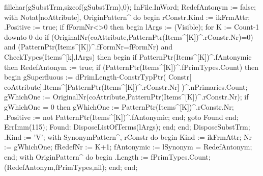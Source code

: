    fillchar(gSubstTrm,sizeof(gSubstTrm),0);
   InFile.InWord;
   RedefAntonym := false;
   with Notat[noAttribute], OriginPattern^ do
   begin
      rConstr.Kind := ikFrmAttr;
      .Positive := true;
      if fFormNr<>0 then
      begin
         lArgs := (Visible);
         for K := Count-1 downto 0 do
            if (OriginalNr(coAttribute,PatternPtr(Items^[K])^.rConstr.Nr)=0) and
                  (PatternPtr(Items^[K])^.fFormNr=fFormNr) and
                  CheckTypes(Items^[k],lArgs) then
            begin
               if PatternPtr(Items^[K])^.fAntonymic then RedefAntonym := true;
               if (PatternPtr(Items^[K])^.fPrimTypes.Count) then
               begin
                  gSuperfluous := dPrimLength-ConstrTypPtr(
                     Constr[ coAttribute].Items^[PatternPtr(Items^[K])^.rConstr.Nr]
                                                          )^.nPrimaries.Count;
                  gWhichOne := OriginalNr(coAttribute,PatternPtr(Items^[K])^.rConstr.Nr);
                  if gWhichOne = 0 then
                     gWhichOne := PatternPtr(Items^[K])^.rConstr.Nr;
                  .Positive :=  not PatternPtr(Items^[K])^.fAntonymic;
               end;
               goto Found
            end;
         ErrImm(115);
         Found:
            DisposeListOfTerms(lArgs);
      end;
   end;
   DisposeSubstTrm;
   .Kind := 'V';
   with SynonymPattern^, rConstr do
   begin
      Kind := ikFrmAttr;
      Nr := gWhichOne;
      fRedefNr :=  K+1;
      fAntonymic := lSynonym = RedefAntonym;
  end;
   with OriginPattern^ do
   begin
      .Length := fPrimTypes.Count;
      (RedefAntonym,fPrimTypes,nil);
   end;
end;
\eatline
{}\nwendcode{}\nwdocspar
